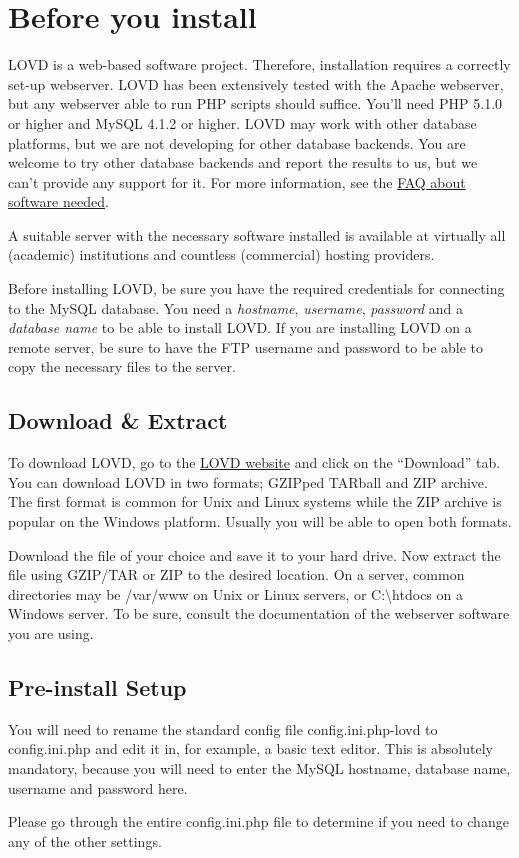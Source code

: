 \documentclass[a4paper,oneside,openany,12pt]{memoir}
\begin{document}
\section{Before you install}
LOVD is a web-based software project.
Therefore, installation requires a correctly set-up webserver.
LOVD has been extensively tested with the Apache webserver, but any webserver able to run PHP scripts should suffice.
You'll need PHP 5.1.0 or higher and MySQL 4.1.2 or higher.
LOVD may work with other database platforms, but we are not developing for other database backends.
You are welcome to try other database backends and report the results to us, but we can't provide any support for it.
For more information, see the \href{http://lovd.nl/3.0/faq/software}{FAQ about software needed}.
\par
A suitable server with the necessary software installed is available at virtually all (academic) institutions and countless (commercial) hosting providers.
\\
\par
Before installing LOVD, be sure you have the required credentials for connecting to the MySQL database.
You need a \emph{hostname}, \emph{username}, \emph{password} and a \emph{database name} to be able to install LOVD.
If you are installing LOVD on a remote server, be sure to have the FTP username and password to be able to copy the necessary files to the server.



\subsection{Download \& Extract}
To download LOVD, go to the \href{http://www.LOVD.nl/3.0/}{LOVD website} and click on the ``Download'' tab.
You can download LOVD in two formats; GZIPped TARball and ZIP archive.
The first format is common for Unix and Linux systems while the ZIP archive is popular on the Windows platform.
Usually you will be able to open both formats.
\\
\par
Download the file of your choice and save it to your hard drive.
Now extract the file using GZIP/TAR or ZIP to the desired location.
On a server, common directories may be /var/www on Unix or Linux servers, or C:\textbackslash{}htdocs on a Windows server.
To be sure, consult the documentation of the webserver software you are using.



\subsection{Pre-install Setup}
You will need to rename the standard config file config.ini.php-lovd to config.ini.php and edit it in, for example, a basic text editor.
This is absolutely mandatory, because you will need to enter the MySQL hostname, database name, username and password here.
\par
Please go through the entire config.ini.php file to determine if you need to change any of the other settings.
\end{document}
